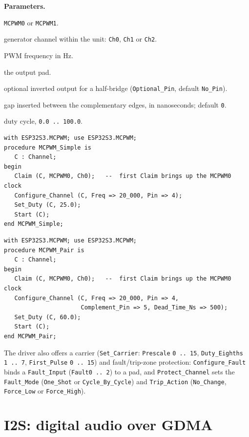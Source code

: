 \textbf{Parameters.}
\begin{description}[style=nextline]
\item[\texttt{Unit}] \texttt{MCPWM0} or \texttt{MCPWM1}.
\item[\texttt{Index}] generator channel within the unit: \texttt{Ch0},
  \texttt{Ch1} or \texttt{Ch2}.
\item[\texttt{Freq}] PWM frequency in Hz.
\item[\texttt{Pin}] the output pad.
\item[\texttt{Complement\_Pin}] optional inverted output for a half-bridge
  (\texttt{Optional\_Pin}, default \texttt{No\_Pin}).
\item[\texttt{Dead\_Time\_Ns}] gap inserted between the complementary edges, in
  nanoseconds; default \texttt{0}.
\item[\texttt{Percent}] duty cycle, \texttt{0.0\,..\,100.0}.
\end{description}

\begin{lstlisting}
with ESP32S3.MCPWM; use ESP32S3.MCPWM;
procedure MCPWM_Simple is
   C : Channel;
begin
   Claim (C, MCPWM0, Ch0);   --  first Claim brings up the MCPWM0 clock
   Configure_Channel (C, Freq => 20_000, Pin => 4);
   Set_Duty (C, 25.0);
   Start (C);
end MCPWM_Simple;
\end{lstlisting}

\begin{lstlisting}
with ESP32S3.MCPWM; use ESP32S3.MCPWM;
procedure MCPWM_Pair is
   C : Channel;
begin
   Claim (C, MCPWM0, Ch0);   --  first Claim brings up the MCPWM0 clock
   Configure_Channel (C, Freq => 20_000, Pin => 4,
                      Complement_Pin => 5, Dead_Time_Ns => 500);
   Set_Duty (C, 60.0);
   Start (C);
end MCPWM_Pair;
\end{lstlisting}
The driver also offers a carrier (\texttt{Set\_Carrier}: \texttt{Prescale}
\texttt{0\,..\,15}, \texttt{Duty\_Eighths} \texttt{1\,..\,7}, \texttt{First\_Pulse}
\texttt{0\,..\,15}) and fault/trip-zone protection: \texttt{Configure\_Fault}
binds a \texttt{Fault\_Input} (\texttt{Fault0\,..\,2}) to a pad, and
\texttt{Protect\_Channel} sets the \texttt{Fault\_Mode} (\texttt{One\_Shot} or
\texttt{Cycle\_By\_Cycle}) and \texttt{Trip\_Action} (\texttt{No\_Change},
\texttt{Force\_Low} or \texttt{Force\_High}).

\section{I2S: digital audio over GDMA}

